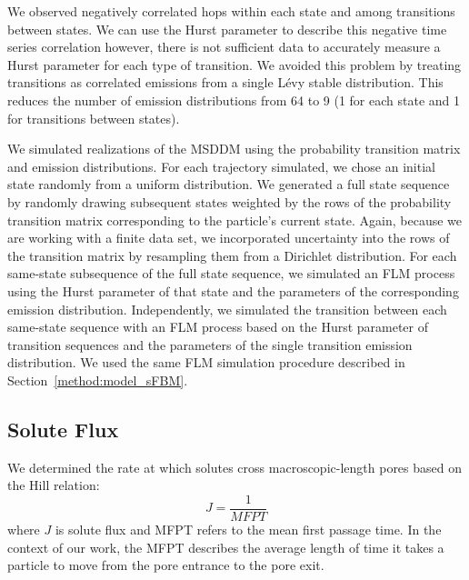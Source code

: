 \documentclass{article}
\begin{document}
  We observed negatively correlated hops within each state and among transitions between
  states. We can use the Hurst parameter to describe this negative time series correlation
  however, there is not sufficient data to accurately measure a Hurst parameter for 
  each type of transition. We avoided this problem by treating transitions as correlated
  emissions from a single L\'evy stable distribution. This reduces the number of emission
  distributions from 64 to 9 (1 for each state and 1 for transitions between states).
  
  We simulated realizations of the MSDDM using the probability transition matrix and 
  emission distributions. For each trajectory simulated, we chose an initial state
  randomly from a uniform distribution. We generated a full state sequence by randomly
  drawing subsequent states weighted by the rows of the probability transition matrix
  corresponding to the particle's current state. Again, because we are working with a
  finite data set, we incorporated uncertainty into the rows of the transition matrix 
  by resampling them from a Dirichlet distribution. For each same-state subsequence of
  the full state sequence, we simulated an FLM process using the Hurst parameter of that
  state and the parameters of the corresponding emission distribution. Independently, 
  we simulated the transition between each same-state sequence with an FLM process 
  based on the Hurst parameter of transition sequences and the parameters of the 
  single transition emission distribution. We used the same FLM simulation procedure
  described in Section~\ref{method:model_sFBM}.


  \subsection{Solute Flux}\label{method:mfpt}
  
  We determined the rate at which solutes cross macroscopic-length pores based on the
  Hill relation:~\cite{hill_free_1989}
  \begin{equation}
  J = \frac{1}{MFPT}
  \end{equation}
  where $J$ is solute flux and MFPT refers to the mean first passage time. In the 
  context of our work, the MFPT describes the average length of time it takes a particle
  to move from the pore entrance to the pore exit.
  
\end{document}
